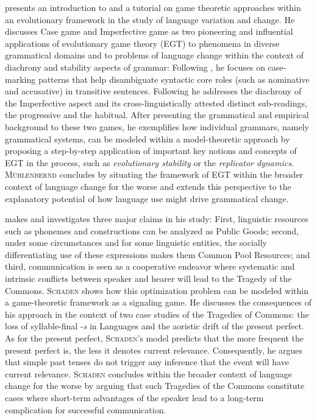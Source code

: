 \documentclass[output=paper,hidelinks]{langscibook}
\begin{document}
\textsc{} presents an introduction to and a tutorial on game theoretic approaches within an evolutionary framework in the study of language variation and change. He discusses  Case game and  Imperfective game as two pioneering and influential applications of evolutionary game theory (EGT) to phenomena in diverse grammatical domains and to problems of language change within the context of diachrony and stability aspects of grammar: Following \citet{Jäger_2007}, he focuses on case-marking patterns that help disambiguate syntactic core roles (such as nominative and accusative) in transitive sentences. Following \citet{Deo_2015} he addresses the diachrony of the Imperfective aspect and its cross-linguistically attested distinct sub-readings, the progressive and the habitual. After presenting the grammatical and empirical background to these two games, he exemplifies how individual grammars, namely grammatical systems, can be modeled within a model-theoretic approach by proposing a step-by-step application of important key notions and concepts of EGT in the process, such as \textit{evolutionary stability} or the \textit{replicator dynamics}. \textsc{Mühlenbernd} concludes by situating the framework of EGT within the broader context of language change for the worse and extends this perspective to the explanatory potential of how language use might drive grammatical change.  

\textsc{} makes and investigates three major claims in his study: First, linguistic resources such as phonemes and constructions can be analyzed as Public Goods; second, under some circumstances and for some linguistic entities, the socially differentiating use of these expressions makes them Common Pool Resources; and third, communication is seen as a cooperative endeavor where systematic and intrinsic conflicts between speaker and hearer will lead to the Tragedy of the Commons. \textsc{Schaden} shows how this optimization problem can be modeled within a game-theoretic framework as a signaling game. He discusses the consequences of his approach in the context of two case studies of the Tragedies of Commons: the loss of syllable-final -\textit{s} in  Languages and the aoristic drift of the present perfect. As for the present perfect, \textsc{Schaden}’s model predicts that the more frequent the present perfect is, the less it denotes current relevance. Consequently, he argues that simple past tenses do not trigger any inference that the event will have current relevance. \textsc{Schaden} concludes within the broader context of language change for the worse by arguing that such Tragedies of the Commons constitute cases where short-term advantages of the speaker lead to a long-term complication for successful communication.  
\end{document}
